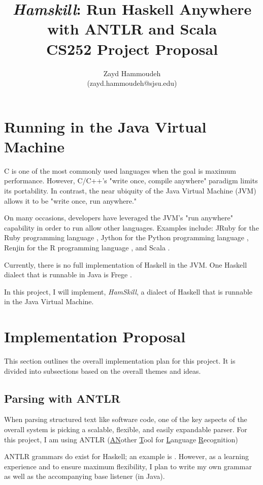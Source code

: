 \documentclass{report}
\title{\emph{Hamskill}: Run Haskell Anywhere with ANTLR and Scala\\[1in]
	   CS252 Project Proposal}
\author{
  Zayd Hammoudeh \\
  (zayd.hammoudeh@sjsu.edu)
  }
\date{}
\begin{document}
\maketitle

\tableofcontents

\renewcommand\thesection{\arabic{section}}
\section{Running in the Java Virtual Machine}

C is one of the most commonly used languages when the goal is maximum performance.  However, C/C++'s "write once, compile anywhere" paradigm limits its portability.  In contrast, the near ubiquity of the Java Virtual Machine (JVM) allows it to be "write once, run anywhere."  

On many occasions, developers have leveraged the JVM's "run anywhere" capability in order to run allow other languages.  Examples include: JRuby for the Ruby programming language \cite{jruby}, Jython for the Python programming language \cite{jython_jvm}, Renjin for the R programming language \cite{renjin}, and Scala \cite{scala}.

Currently, there is no full implementation of Haskell in the JVM.  One Haskell dialect that is runnable in Java is Frege \cite{frege}.  

In this project, I will implement, \emph{HamSkill}, a dialect of Haskell that is runnable in the Java Virtual Machine.

\section{Implementation Proposal}

This section outlines the overall implementation plan for this project.  It is divided into subsections based on the overall themes and ideas.  

\subsection{Parsing with ANTLR}

When parsing structured text like software code, one of the key aspects of the overall system is picking a scalable, flexible, and easily expandable parser.  For this project, I am using ANTLR (\underline{AN}other \underline{T}ool for \underline{L}anguage \underline{R}ecognition)

ANTLR grammars do exist for Haskell; an example is \cite{antlrHaskellLexer}.  However, as a learning experience and to ensure maximum flexibility, I plan to write my own grammar as well as the accompanying base listener (in Java).  
\end{document}
